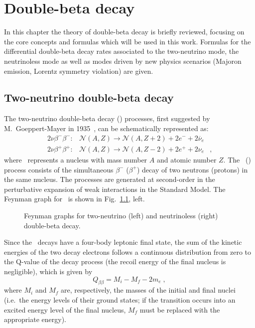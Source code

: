 \chapter{Double-beta decay}\label{chap:theory}

In this chapter the theory of double-beta decay is briefly reviewed, focusing
on the core concepts and formulas which will be used in this work. Formulas for
the differential double-beta decay rates associated to the two-neutrino mode,
the neutrinoless mode as well as modes driven by new physics scenarios (Majoron
emission, Lorentz symmetry violation) are given.

\section{Two-neutrino double-beta decay}

The two-neutrino double-beta decay (\nnbb) processes, first suggested by
M.~Goeppert-Mayer in 1935~\cite{GoeppertMayer1935}, can be schematically
represented as:
\[
  \begin{array}{llr}
    2\nu\beta^-\beta^-: &
      \mathcal{N}(A,Z) \longrightarrow \mathcal{N}(A,Z+2)+2e^-+2{\overline \nu}_e & \\
    2\nu\beta^+\beta^+: &
      \mathcal{N}(A,Z) \longrightarrow \mathcal{N}(A,Z-2)+2e^++2\nu_e &,
  \end{array}
\]
where \NAZ\ represents a nucleus with mass number $A$ and atomic number $Z$. The
\nnbbm\ (\nnbbp) process consists of the simultaneous $\beta^-$ ($\beta^+$)
decay of two neutrons (protons) in the same nucleus. The processes are
generated at second-order in the perturbative expansion of weak interactions in
the Standard Model. The Feynman graph for \nnbbm\ is shown in
Fig.~\cref{fig:nbb:feydiag}, left.

\begin{figure}
  \centering%
  \caption{%
    Feynman graphs for two-neutrino (left) and neutrinoless (right) double-beta
    decay.
  }\label{fig:nbb:feydiag}
\end{figure}

Since the \nnbb\ decays have a four-body leptonic final state, the sum of the
kinetic energies of the two decay electrons follows a continuous distribution
from zero to the Q-value of the decay process (the recoil energy of the final
nucleus is negligible), which is given by
\begin{equation}
  Q_{\beta\beta} = M_i - M_f - 2m_e \;,
\end{equation}
where $M_i$ and $M_f$ are, respectively, the masses of the initial and final
nuclei (i.e.~the energy levels of their ground states; if the transition occurs
into an excited energy level of the final nucleus, $M_f$ must be replaced with
the appropriate energy).

